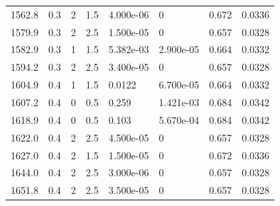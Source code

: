 \documentclass[preview]{standalone}
\begin{document}
{{{{{\begin{tabular}{L{1.2cm}C{1.2cm} C{0.3cm}C{0.5cm} C{1.4cm}C{1.4cm} C{1.4cm}C{1.4cm}}
  1562.8  &   0.3  & 2     & 1.5 &  4.000e-06  & 0  & 0.672 &  0.0336   \\ 
  1579.9  &   0.3  & 2     & 2.5 &  1.500e-05  & 0  & 0.657 &  0.0328   \\ 
  1582.9  &   0.3  & 1     & 1.5 &  5.382e-03  & 2.900e-05  & 0.664 &  0.0332   \\ 
  1594.2  &   0.3  & 2     & 2.5 &  3.400e-05  & 0  & 0.657 &  0.0328   \\ 
  1604.9  &   0.4  & 1     & 1.5 &  0.0122  & 6.700e-05  & 0.664 &  0.0332   \\ 
  1607.2  &   0.4  & 0     & 0.5 &  0.259  & 1.421e-03  & 0.684 &  0.0342   \\ 
  1618.9  &   0.4  & 0     & 0.5 &  0.103  & 5.670e-04  & 0.684 &  0.0342   \\ 
  1622.0  &   0.4  & 2     & 2.5 &  4.500e-05  & 0  & 0.657 &  0.0328   \\ 
  1627.0  &   0.4  & 2     & 1.5 &  1.500e-05  & 0  & 0.672 &  0.0336   \\ 
  1644.0  &   0.4  & 2     & 2.5 &  3.000e-06  & 0  & 0.657 &  0.0328   \\ 
  1651.8  &   0.4  & 2     & 2.5 &  3.500e-05  & 0  & 0.657 &  0.0328   \\ 
\hline 
\end{tabular} 

}}}}}
\end{document}
